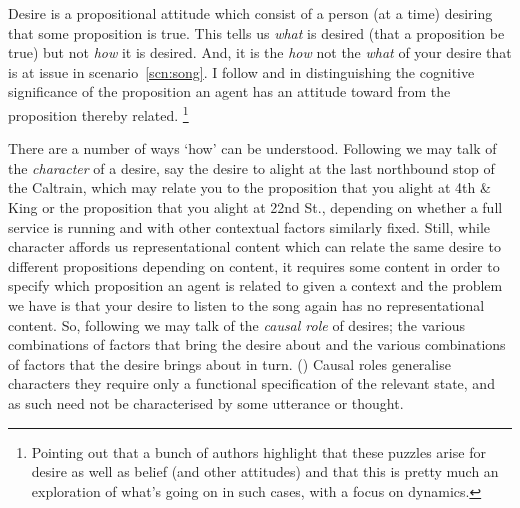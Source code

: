 \documentclass[10pt]{article}
\begin{document}
Desire is a propositional attitude which consist of a person (at a time) desiring that some proposition is true.
This tells us \emph{what} is desired (that a proposition be true) but not \emph{how} it is desired.
And, it is the \emph{how} not the \emph{what} of your desire that is at issue in scenario~\ref{scn:song}.
I follow \citeauthor{Kaplan:1989ab} and \citeauthor{Perry:1993aa} in distinguishing the cognitive significance of the proposition an agent has an attitude toward from the proposition thereby related.\nolinebreak
\footnote{\color{red} Pointing out that a bunch of authors highlight that these puzzles arise for desire as well as belief (and other attitudes) and that this is pretty much an exploration of what's going on in such cases, with a focus on dynamics.}

There are a number of ways `how' can be understood.
Following \citeauthor{Kaplan:1989ab} we may talk of the \emph{character} of a desire, say the desire to alight at the last northbound stop of the Caltrain, which may relate you to the proposition that you alight at 4th \& King or the proposition that you alight at 22nd St., depending on whether a full service is running and with other contextual factors similarly fixed.
Still, while character affords us representational content which can relate the same desire to different propositions depending on content, it requires some content in order to specify which proposition an agent is related to given a context and the problem we have is that your desire to listen to the song again has no representational content.
So, following \citeauthor{Perry:1997aa} we may talk of the \emph{causal role} of desires; the various combinations of factors that bring the desire about and the various combinations of factors that the desire brings about in turn. (\citeyear[360--361]{Perry:1997aa})
Causal roles generalise characters they require only a functional specification of the relevant state, and as such need not be characterised by some utterance or thought.
\end{document}
